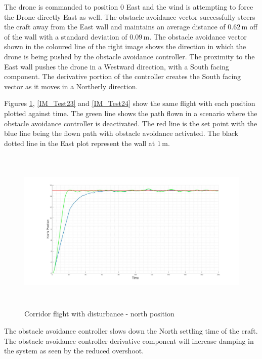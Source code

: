 		The drone is commanded to position 0 East and the wind is attempting to force the Drone directly East as well. The obstacle avoidance vector successfully steers the craft away from the East wall and maintains an average distance of $0.62$\,m off of the wall with a standard deviation of $0.09$\,m. The obstacle avoidance vector shown in the coloured line of the right image shows the direction in which the drone is being pushed by the obstacle avoidance controller. The proximity to the East wall pushes the drone in a Westward direction, with a South facing component. The derivative portion of the controller creates the South facing vector as it moves in a Northerly direction.
		
		Figures \ref{IM_Test22}, \ref{IM_Test23} and \ref{IM_Test24} show the same flight with each position plotted against time. The green line shows the path flown in a scenario where the obstacle avoidance controller is deactivated. The red line is the set point with the blue line being the flown path with obstacle avoidance activated. The black dotted line in the East plot represent the wall at $1$\,m.
		
		\begin{figure}[H]
			\centering
			\includegraphics[height = 7.9cm]{../References/Testing/CorridorFlight_2Wind_North.jpg}     
			\caption{Corridor flight with disturbance - north position}
			\label{IM_Test22}
		\end{figure}
		
		The obstacle avoidance controller slows down the North settling time of the craft. The obstacle avoidance controller derivative component will increase damping in the system as seen by the reduced overshoot.
		
